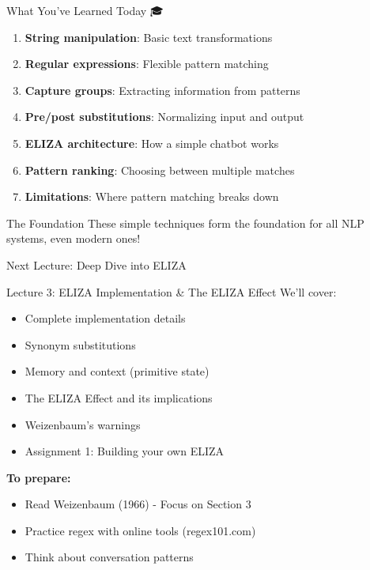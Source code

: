 \documentclass[aspectratio=169]{beamer}
\begin{document}
\begin{frame}[shrink=10]{What You've Learned Today 🎓}
\begin{enumerate}\setlength{\itemsep}{0pt}
    \item \textbf{String manipulation}: Basic text transformations
    \item \textbf{Regular expressions}: Flexible pattern matching
    \item \textbf{Capture groups}: Extracting information from patterns
    \item \textbf{Pre/post substitutions}: Normalizing input and output
    \item \textbf{ELIZA architecture}: How a simple chatbot works
    \item \textbf{Pattern ranking}: Choosing between multiple matches
    \item \textbf{Limitations}: Where pattern matching breaks down
\end{enumerate}

\vspace{0.3cm}

\begin{alertblock}{The Foundation}
These simple techniques form the foundation for all NLP systems, even modern ones!
\end{alertblock}
\end{frame}

\begin{frame}[shrink=10]{Next Lecture: Deep Dive into ELIZA 🔮}
\small
\begin{block}{Lecture 3: ELIZA Implementation \& The ELIZA Effect}
We'll cover:
\begin{itemize}\setlength{\itemsep}{0pt}
    \item Complete implementation details
    \item Synonym substitutions
    \item Memory and context (primitive state)
    \item The ELIZA Effect and its implications
    \item Weizenbaum's warnings
    \item Assignment 1: Building your own ELIZA
\end{itemize}
\end{block}

\vspace{0.3cm}

\textbf{To prepare:}
\begin{itemize}\setlength{\itemsep}{0pt}
    \item Read Weizenbaum (1966) - Focus on Section 3
    \item Practice regex with online tools (regex101.com)
    \item Think about conversation patterns
\end{itemize}
\end{frame}
\end{document}
